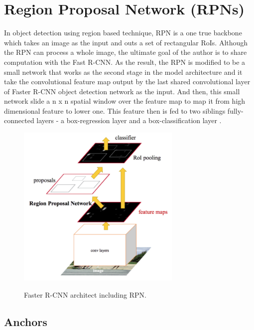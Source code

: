 	
\section{Region Proposal Network (RPNs)}
\label{section:rpns}
\noindent	

	In object detection using region based technique, RPN is a one true backbone which takes an image as the input and outs a set of rectangular RoIs. Although the RPN can process a whole image, the ultimate goal of the author is to share computation with the Fast R-CNN. As the result, the RPN is modified to be a small network that works as the second stage in the model architecture and it take the convolutional feature map output by the last shared convolutional layer of Faster R-CNN object detection network as the input. And then, this small network slide a n x n spatial window over the feature map to map it from high dimensional feature to lower one. This feature then is fed to two siblings fully-connected layers - a box-regression layer and a box-classification layer \cite{fasterrcnn}.
	
	\begin{figure}[H]
		\centering
		{\includegraphics[width=0.7\textwidth]{./hinhanh/chap4/faster_rcnn.png}}
		\caption{Faster R-CNN architect including RPN.}
	\end{figure}
	
\subsection{Anchors}
\label{subsection:anchors}
\noindent		

